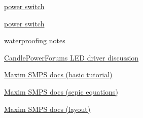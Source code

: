 \documentclass[12pt]{article} %
\begin{document}
\begin{compactitem}
	\item \href{http://softsolder.com/2013/10/03/arduino-suicide-power-switch-first-light/}{power switch}
	\item \href{http://www.instructables.com/id/Soft-Latch-Power-Switch-Ardweeny/}{power switch}
	\item \href{https://electronics.stackexchange.com/questions/94796/are-there-any-consumer-grade-waterproofing-solutions}{waterproofing notes}
	\item \href{http://www.candlepowerforums.com/vb/showthread.php?8583-Best-Chip-Step-Up-Circuit-Design-for-the-new-5W-Luxeon-Star/page5}{CandlePowerForums LED driver discussion}
	\item \href{http://www.maximintegrated.com/app-notes/index.mvp/id/2031}{Maxim SMPS docs (basic tutorial)}
	\item \href{http://www.maximintegrated.com/app-notes/index.mvp/id/1051}{Maxim SMPS docs (sepic equations)}
	\item \href{http://www.maximintegrated.com/app-notes/index.mvp/id/2997}{Maxim SMPS docs (layout)}
	\item 
	\item 



\end{compactitem}

\end{document}
